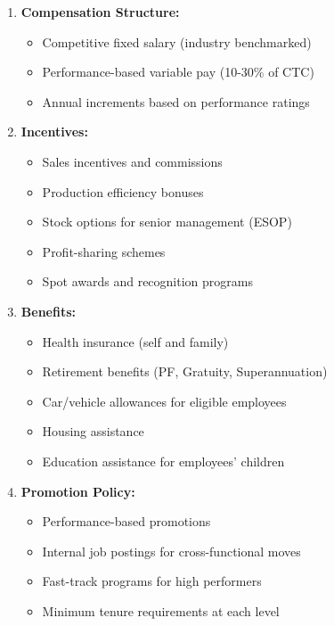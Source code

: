 \documentclass[12pt,a4paper]{article}
\begin{document}
\begin{enumerate}[leftmargin=*]
    \item \textbf{Compensation Structure:}
    \begin{itemize}
        \item Competitive fixed salary (industry benchmarked)
        \item Performance-based variable pay (10-30\% of CTC)
        \item Annual increments based on performance ratings
    \end{itemize}
    
    \item \textbf{Incentives:}
    \begin{itemize}
        \item Sales incentives and commissions
        \item Production efficiency bonuses
        \item Stock options for senior management (ESOP)
        \item Profit-sharing schemes
        \item Spot awards and recognition programs
    \end{itemize}
    
    \item \textbf{Benefits:}
    \begin{itemize}
        \item Health insurance (self and family)
        \item Retirement benefits (PF, Gratuity, Superannuation)
        \item Car/vehicle allowances for eligible employees
        \item Housing assistance
        \item Education assistance for employees' children
    \end{itemize}
    
    \item \textbf{Promotion Policy:}
    \begin{itemize}
        \item Performance-based promotions
        \item Internal job postings for cross-functional moves
        \item Fast-track programs for high performers
        \item Minimum tenure requirements at each level
    \end{itemize}
\end{enumerate}
\end{document}
